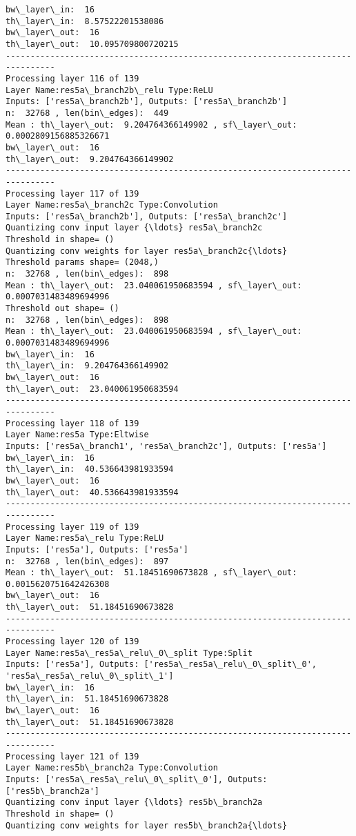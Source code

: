 \documentclass[11pt]{article}
\begin{document}
\begin{Verbatim}[commandchars=\\\{\}]
bw\_layer\_in:  16
th\_layer\_in:  8.57522201538086
bw\_layer\_out:  16
th\_layer\_out:  10.095709800720215
--------------------------------------------------------------------------------
Processing layer 116 of 139
Layer Name:res5a\_branch2b\_relu Type:ReLU
Inputs: ['res5a\_branch2b'], Outputs: ['res5a\_branch2b']
n:  32768 , len(bin\_edges):  449
Mean : th\_layer\_out:  9.204764366149902 , sf\_layer\_out:  0.0002809156885326671
bw\_layer\_out:  16
th\_layer\_out:  9.204764366149902
--------------------------------------------------------------------------------
Processing layer 117 of 139
Layer Name:res5a\_branch2c Type:Convolution
Inputs: ['res5a\_branch2b'], Outputs: ['res5a\_branch2c']
Quantizing conv input layer {\ldots} res5a\_branch2c
Threshold in shape= ()
Quantizing conv weights for layer res5a\_branch2c{\ldots}
Threshold params shape= (2048,)
n:  32768 , len(bin\_edges):  898
Mean : th\_layer\_out:  23.040061950683594 , sf\_layer\_out:  0.0007031483489694996
Threshold out shape= ()
n:  32768 , len(bin\_edges):  898
Mean : th\_layer\_out:  23.040061950683594 , sf\_layer\_out:  0.0007031483489694996
bw\_layer\_in:  16
th\_layer\_in:  9.204764366149902
bw\_layer\_out:  16
th\_layer\_out:  23.040061950683594
--------------------------------------------------------------------------------
Processing layer 118 of 139
Layer Name:res5a Type:Eltwise
Inputs: ['res5a\_branch1', 'res5a\_branch2c'], Outputs: ['res5a']
bw\_layer\_in:  16
th\_layer\_in:  40.536643981933594
bw\_layer\_out:  16
th\_layer\_out:  40.536643981933594
--------------------------------------------------------------------------------
Processing layer 119 of 139
Layer Name:res5a\_relu Type:ReLU
Inputs: ['res5a'], Outputs: ['res5a']
n:  32768 , len(bin\_edges):  897
Mean : th\_layer\_out:  51.18451690673828 , sf\_layer\_out:  0.0015620751642426308
bw\_layer\_out:  16
th\_layer\_out:  51.18451690673828
--------------------------------------------------------------------------------
Processing layer 120 of 139
Layer Name:res5a\_res5a\_relu\_0\_split Type:Split
Inputs: ['res5a'], Outputs: ['res5a\_res5a\_relu\_0\_split\_0', 'res5a\_res5a\_relu\_0\_split\_1']
bw\_layer\_in:  16
th\_layer\_in:  51.18451690673828
bw\_layer\_out:  16
th\_layer\_out:  51.18451690673828
--------------------------------------------------------------------------------
Processing layer 121 of 139
Layer Name:res5b\_branch2a Type:Convolution
Inputs: ['res5a\_res5a\_relu\_0\_split\_0'], Outputs: ['res5b\_branch2a']
Quantizing conv input layer {\ldots} res5b\_branch2a
Threshold in shape= ()
Quantizing conv weights for layer res5b\_branch2a{\ldots}

\end{Verbatim}
\end{document}
